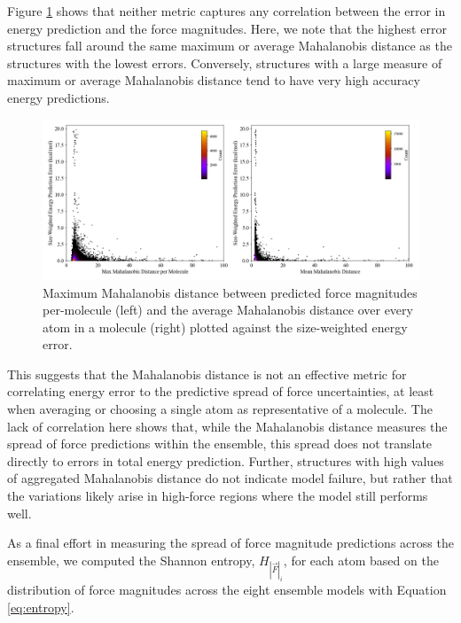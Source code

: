Figure \ref{fig:mahalanobis} shows that neither metric captures any correlation between the error in energy prediction and the force magnitudes.
Here, we note that the highest error structures fall around the same maximum or average Mahalanobis distance as the structures with the lowest errors.
Conversely, structures with a large measure of maximum or average Mahalanobis distance tend to have very high accuracy energy predictions.

\begin{figure}[!h]
    \centering
    \includegraphics[width=1\linewidth]{Images/2xr_forces/2xr_comp6v1_mahalanobis-uncertainty-vs-energy.png}
    \caption[Mahalanobis distance between ensemble predictions of force magnitude]{Maximum Mahalanobis distance between predicted force magnitudes per-molecule (left) and the average Mahalanobis distance over every atom in a molecule (right) plotted against the size-weighted energy error.}
    \label{fig:mahalanobis}
\end{figure}

This suggests that the Mahalanobis distance is not an effective metric for correlating energy error to the predictive spread of force uncertainties, at least when averaging or choosing a single atom as representative of a molecule.
The lack of correlation here shows that, while the Mahalanobis distance measures the spread of force predictions within the ensemble, this spread does not translate directly to errors in total energy prediction.
Further, structures with high values of aggregated Mahalanobis distance do not indicate model failure, but rather that the variations likely arise in high-force regions where the model still performs well.

As a final effort in measuring the spread of force magnitude predictions across the ensemble, we computed the Shannon entropy, $H_{|\vec{F}|_i}$,  for each atom based on the distribution of force magnitudes across the eight ensemble models with Equation \ref{eq:entropy}.

